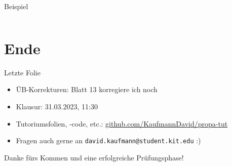 \documentclass{beamer}
\begin{document}
\begin{frame}{Beispiel}
    \begin{columns}
        \begin{column}
            
        \end{column}
    \end{columns}
\end{frame}

\section{Ende}

\begin{frame}{Letzte Folie}
  \begin{itemize}
    \item ÜB-Korrekturen: Blatt 13 korregiere ich noch
    \item Klausur: 31.03.2023, 11:30
    \item Tutoriumsfolien, -code, etc.: \href{https://github.com/KaufmannDavid/propa-tut}{github.com/KaufmannDavid/propa-tut}
    \item Fragen auch gerne an \texttt{david.kaufmann@student.kit.edu} :)
  \end{itemize}

  \vfill

  Danke fürs Kommen und eine erfolgreiche Prüfungsphase!
\end{frame}
\end{document}
